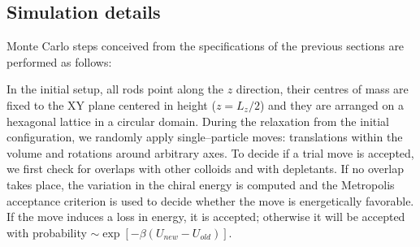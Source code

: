 


\subsection{Simulation details}
\label{simdetails}
Monte Carlo steps conceived from the specifications of the previous sections are performed as follows:

In the initial setup, all rods point along the $z$ direction, their centres of mass are fixed to the XY plane centered in height ($z=L_z/2$) and they are arranged on a hexagonal lattice in a circular domain. During the relaxation from the initial configuration, we randomly apply single--particle moves: translations within the volume and rotations around arbitrary axes. To decide if a trial move is accepted, we first check for overlaps with other colloids and with depletants. If no overlap takes place, the variation in the chiral energy is computed and the Metropolis acceptance criterion is used to decide whether the move is energetically favorable. If the move induces a loss in energy, it is accepted; otherwise it will be accepted with probability $\sim\exp{\left[-\beta(U_{new}-U_{old})\right]}$.

